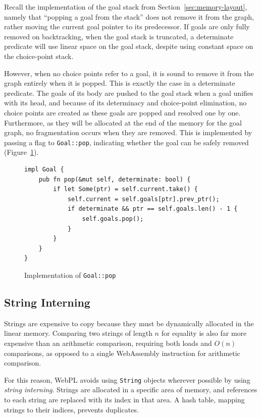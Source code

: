 Recall the implementation of the goal stack from Section~\ref{sec:memory-layout}, namely that ``popping a goal from the stack'' does not remove it from the graph, rather moving the current goal pointer to its predecessor. If goals are only fully removed on backtracking, when the goal stack is truncated, a determinate predicate will use linear space on the goal stack, despite using constant space on the choice-point stack.

However, when no choice points refer to a goal, it is sound to remove it from the graph entirely when it is popped. This is exactly the case in a determinate predicate. The goals of its body are pushed to the goal stack when a goal unifies with its head, and because of its determinacy and choice-point elimination, no choice points are created as these goals are popped and resolved one by one. Furthermore, as they will be allocated at the end of the memory for the goal graph, no fragmentation occurs when they are removed. This is implemented by passing a flag to \texttt{Goal::pop}, indicating whether the goal can be safely removed (Figure~\ref{fig:goal-pop}).

\begin{figure}[H]
\centering
\begin{verbatim}
impl Goal {
    pub fn pop(&mut self, determinate: bool) {
        if let Some(ptr) = self.current.take() {
            self.current = self.goals[ptr].prev_ptr();
            if determinate && ptr == self.goals.len() - 1 {
                self.goals.pop();
            }
        }
    }
}
\end{verbatim}
\caption{Implementation of \texttt{Goal::pop}}
\label{fig:goal-pop}
\end{figure}

\subsection{String Interning}

Strings are expensive to copy because they must be dynamically allocated in the linear memory. Comparing two strings of length $n$ for equality is also far more expensive than an arithmetic comparison, requiring both loads and $O(n)$ comparisons, as opposed to a single WebAssembly instruction for arithmetic comparison.

For this reason, WebPL avoids using \texttt{String} objects wherever possible by using \emph{string interning}. Strings are allocated in a specific area of memory, and references to each string are replaced with its index in that area. A hash table, mapping strings to their indices, prevents duplicates.

